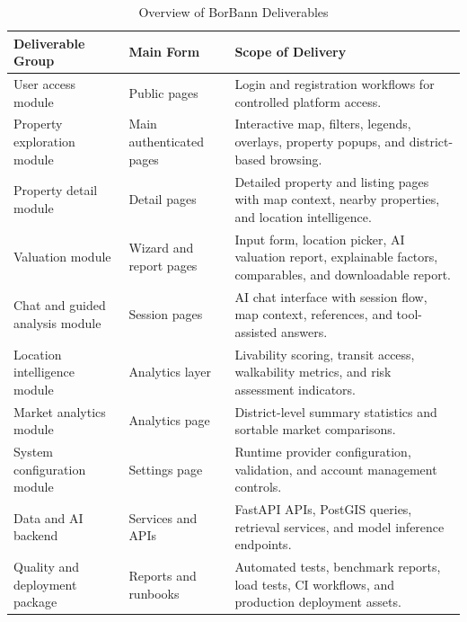 \begin{table}[htbp]
    \centering
    \small
    \renewcommand{\arraystretch}{1.25}
    \begin{tabularx}{\textwidth}{>{\raggedright\arraybackslash}p{}>{\raggedright\arraybackslash}p{}>{\raggedright\arraybackslash}X}
        \toprule
        \rowcolor[gray]{0.9} \textbf{Deliverable Group} & \textbf{Main Form} & \textbf{Scope of Delivery} \\
        \midrule
        User access module & Public pages & Login and registration workflows for controlled platform access. \\
        Property exploration module & Main authenticated pages & Interactive map, filters, legends, overlays, property popups, and district-based browsing. \\
        Property detail module & Detail pages & Detailed property and listing pages with map context, nearby properties, and location intelligence. \\
        Valuation module & Wizard and report pages & Input form, location picker, AI valuation report, explainable factors, comparables, and downloadable report. \\
        Chat and guided analysis module & Session pages & AI chat interface with session flow, map context, references, and tool-assisted answers. \\
        Location intelligence module & Analytics layer & Livability scoring, transit access, walkability metrics, and risk assessment indicators. \\
        Market analytics module & Analytics page & District-level summary statistics and sortable market comparisons. \\
        System configuration module & Settings page & Runtime provider configuration, validation, and account management controls. \\
        Data and AI backend & Services and APIs & FastAPI APIs, PostGIS queries, retrieval services, and model inference endpoints. \\
        Quality and deployment package & Reports and runbooks & Automated tests, benchmark reports, load tests, CI workflows, and production deployment assets. \\
        \bottomrule
    \end{tabularx}
    \caption{Overview of BorBann Deliverables}
    \label{tab:chapter7-overview}
\end{table}

